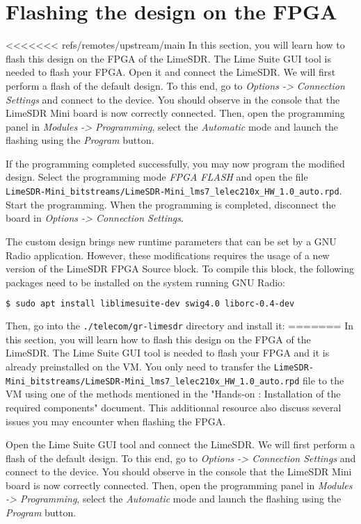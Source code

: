 


\section{Flashing the design on the FPGA}

<<<<<<< refs/remotes/upstream/main
 In this section, you will learn how to flash this design on the FPGA of the LimeSDR. The Lime Suite GUI tool is needed to flash your FPGA. Open it and connect the LimeSDR. We will first perform a flash of the default design. To this end, go to \textit{Options -> Connection Settings} and connect to the device. You should observe in the console that the LimeSDR Mini board is now correctly connected. Then, open the programming panel in \textit{Modules -> Programming}, select the \textit{Automatic} mode and launch the flashing using the \textit{Program} button.

If the programming completed successfully, you may now program the modified design. Select the programming mode \textit{FPGA FLASH} and open the file \\ \texttt{LimeSDR-Mini\_bitstreams/LimeSDR-Mini\_lms7\_lelec210x\_HW\_1.0\_auto.rpd}. Start the programming. When the programming is completed, disconnect the board in \textit{Options -> Connection Settings}.

The custom design brings new runtime parameters that can be set by a GNU Radio application. However, these modifications requires the usage of a new version of the LimeSDR FPGA Source block. To compile this block, the following packages need to be installed on the system running GNU Radio:
\begin{lstlisting}[language=bash]
    $ sudo apt install liblimesuite-dev swig4.0 liborc-0.4-dev
\end{lstlisting}
Then, go into the \texttt{./telecom/gr-limesdr} directory and install it:
=======
 In this section, you will learn how to flash this design on the FPGA of the LimeSDR. The Lime Suite GUI tool is needed to flash your FPGA and it is already preinstalled on the VM. You only need to transfer the \texttt{LimeSDR-Mini\_bitstreams/LimeSDR-Mini\_lms7\_lelec210x\_HW\_1.0\_auto.rpd} file to the VM using one of the methods mentioned in the "Hands-on \handsOnN: Installation of the required components" document. This additionnal resource also discuss several issues you may encounter when flashing the FPGA.

Open the Lime Suite GUI tool and connect the LimeSDR. We will first perform a flash of the default design. To this end, go to \textit{Options -> Connection Settings} and connect to the device. You should observe in the console that the LimeSDR Mini board is now correctly connected. Then, open the programming panel in \textit{Modules -> Programming}, select the \textit{Automatic} mode and launch the flashing using the \textit{Program} button.

